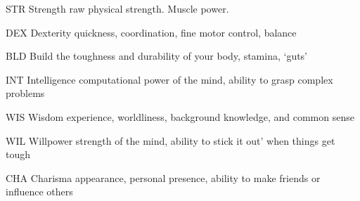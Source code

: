 \documentclass[twoside]{book}
\begin{document}
                 STR   
                    Strength raw physical strength. Muscle power.
                   
                
                
                 DEX   
                   Dexterity quickness, coordination, fine motor
                   control, balance 
                
                
                 BLD   
                   Build the toughness and durability of your body,
                   stamina, `guts' 
                
                
                 INT   
                   Intelligence computational power of the mind,
                   ability to grasp complex problems 
                
                
                 WIS   
                   Wisdom experience, worldliness, background
                   knowledge, and common sense 
                
                
                 WIL   
                   Willpower strength of the mind, ability to
                   stick it out' when things get tough
                   
                
                
                 CHA   
                   Charisma appearance, personal presence, ability
                   to make friends or influence others 
                
            
\end{document}
